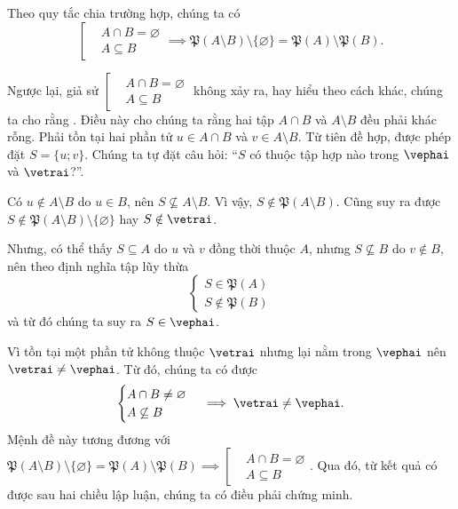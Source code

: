 Theo quy tắc chia trường hợp, chúng ta có 
\begin{equation*}
   \left[\begin{aligned}
      &A \cap B = \varnothing \\
      &A \subseteq B
   \end{aligned}\right. \implies \mathfrak{P}(A \setminus B) \setminus \{\varnothing\} = \mathfrak{P}(A) \setminus \mathfrak{P}(B).
\end{equation*}

Ngược lại, giả sử $\left[\begin{aligned}
   &A \cap B = \varnothing \\
   &A \subseteq B
\end{aligned}\right.$ không xảy ra, hay hiểu theo cách khác, chúng ta cho rằng . Điều này cho chúng ta rằng hai tập $A \cap B$ và $A \setminus B$ đều phải khác rỗng. Phải tồn tại hai phần tử $u \in A \cap B$ và $v \in A \setminus B$. Từ tiên đề hợp, được phép đặt $S = \{u; v\}$. Chúng ta tự đặt câu hỏi: ``$S$ có thuộc tập hợp nào trong $\vephai$ và $\vetrai$?''.

Có $u \notin A \setminus B$ do $u \in B$, nên $S \not\subseteq A \setminus B$. Vì vậy, $S \notin \mathfrak{P}(A \setminus B)$. Cũng suy ra được $S \notin \mathfrak{P}(A \setminus B) \setminus \{\varnothing\}$ hay $S \notin \vetrai$. 

Nhưng, có thể thấy $S \subseteq A$ do $u$ và $v$ đồng thời thuộc $A$, nhưng $S \not\subseteq B$ do $v \notin B$, nên theo định nghĩa tập lũy thừa
$$\begin{cases}
   S \in \mathfrak{P}(A) \\
   S \notin \mathfrak{P}(B)
\end{cases}$$ và từ đó chúng ta suy ra $S \in \vephai$.

Vì tồn tại một phần tử không thuộc $\vetrai$ nhưng lại nằm trong $\vephai$ nên $\vetrai \neq \vephai$. Từ đó, chúng ta có được
\begin{equation*}
   \begin{cases}
      A \cap B \neq \varnothing \\
      A \not\subseteq B
   \end{cases} \implies \vetrai \neq \vephai.
\end{equation*}
Mệnh đề này tương đương với 
$
   \mathfrak{P}(A \setminus B) \setminus \{\varnothing\} = \mathfrak{P}(A) \setminus \mathfrak{P}(B) \implies \left[\begin{aligned}
      &A \cap B = \varnothing \\
      &A \subseteq B
   \end{aligned}\right. .
$ Qua đó, từ kết quả có được sau hai chiều lập luận, chúng ta có điều phải chứng minh.

